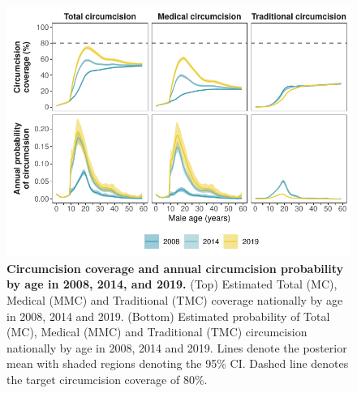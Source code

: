 \documentclass{article}
\begin{document}

\begin{figure}[H]
  \centering
  \includegraphics[width = 5.2in]{Figures/paper/Figure2.pdf}
  \caption{{\bf Circumcision coverage and annual circumcision probability by age in 2008, 2014, and 2019.}
    (Top) Estimated Total (MC), Medical (MMC) and Traditional (TMC)  coverage nationally by age in 2008, 2014 and 2019. (Bottom) Estimated probability of Total (MC), Medical (MMC) and Traditional (TMC) circumcision nationally by age in 2008, 2014 and 2019. Lines denote the posterior mean with shaded regions denoting the 95\% CI. Dashed line denotes the target circumcision coverage of 80\%.}
  \label{fig::singleageprev}
\end{figure}

\end{document}
